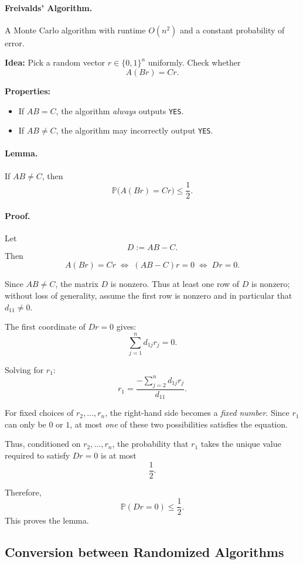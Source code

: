 \documentclass{article}
\begin{document}
\paragraph{Freivalds' Algorithm.}  
A Monte Carlo algorithm with runtime $O(n^{2})$ and a constant probability of error.

\medskip
\textbf{Idea:}
Pick a random vector $r \in \{0,1\}^{n}$ uniformly.  
Check whether
\[
A(Br) = Cr.
\]

\medskip
\textbf{Properties:}
\begin{itemize}
    \item If $AB = C$, the algorithm \emph{always} outputs \texttt{YES}.
    \item If $AB \neq C$, the algorithm may incorrectly output \texttt{YES}.
\end{itemize}

\paragraph{Lemma.}  
If $AB \neq C$, then
\[
\mathbb{P}\bigl(A(Br) = Cr \bigr) \le \frac{1}{2}.
\]

\paragraph{Proof.}
Let
\[
D := AB - C.
\]
Then
\[
A(Br)=Cr \;\Longleftrightarrow\; (AB-C)r = 0 \;\Longleftrightarrow\; Dr = 0.
\]

Since $AB \neq C$, the matrix $D$ is nonzero.  
Thus at least one row of $D$ is nonzero; without loss of generality, assume the first row is nonzero and in particular that $d_{11} \neq 0$.

The first coordinate of $Dr = 0$ gives:
\[
\sum_{j=1}^{n} d_{1j} r_j = 0.
\]

Solving for $r_1$:
\[
r_1 = \frac{-\sum_{j=2}^{n} d_{1j} r_j}{d_{11}}.
\]

For fixed choices of $r_2, \dots, r_n$, the right-hand side becomes a \emph{fixed number}.  
Since $r_1$ can only be $0$ or $1$, at most \emph{one} of these two possibilities satisfies the equation.

Thus, conditioned on $r_2,\dots,r_n$, the probability that $r_1$ takes the unique value required to satisfy $Dr=0$ is at most
\[
\frac{1}{2}.
\]

Therefore,
\[
\mathbb{P}(Dr=0) \le \frac{1}{2}.
\]
This proves the lemma.


\subsection{Conversion between Randomized Algorithms}
\end{document}
